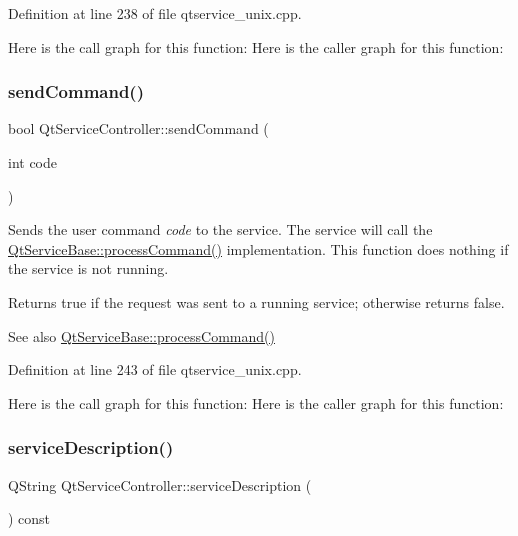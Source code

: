 Definition at line 238 of file qtservice\+\_\+unix.\+cpp.

Here is the call graph for this function\+:
Here is the caller graph for this function\+:
\mbox{\label{class_qt_service_controller_a1428c7d51403416bc7663ae37c446cfc}} 
\subsubsection{\texorpdfstring{send\+Command()}{sendCommand()}}
{\footnotesize\ttfamily bool Qt\+Service\+Controller\+::send\+Command (\begin{DoxyParamCaption}\item[{int}]{code }\end{DoxyParamCaption})}

Sends the user command {\itshape code} to the service. The service will call the \mbox{\hyperlink{class_qt_service_base_a47485f00f6eba0758d2ffc75092295cf}{Qt\+Service\+Base\+::process\+Command()}} implementation. This function does nothing if the service is not running.

Returns true if the request was sent to a running service; otherwise returns false.

\begin{DoxySeeAlso}{See also}
\mbox{\hyperlink{class_qt_service_base_a47485f00f6eba0758d2ffc75092295cf}{Qt\+Service\+Base\+::process\+Command()}} 
\end{DoxySeeAlso}


Definition at line 243 of file qtservice\+\_\+unix.\+cpp.

Here is the call graph for this function\+:
Here is the caller graph for this function\+:
\mbox{\label{class_qt_service_controller_a503c0fadf098b4c5bbccbb2a57f911e2}} 
\subsubsection{\texorpdfstring{service\+Description()}{serviceDescription()}}
{\footnotesize\ttfamily Q\+String Qt\+Service\+Controller\+::service\+Description (\begin{DoxyParamCaption}{ }\end{DoxyParamCaption}) const}

